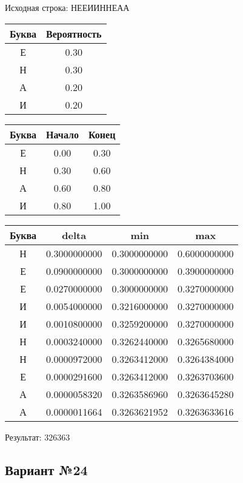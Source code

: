 \documentclass[a4paper, 12pt]{article}
\begin{document}
Исходная строка: НЕЕИИННЕАА\
\begin{center}
 \begin{tabular}{ |c|c| } 
  \hline
     Буква & Вероятность \\ \hline
Е & 0.30\\\hline
Н & 0.30\\\hline
А & 0.20\\\hline
И & 0.20
\\ \hline \end{tabular}
\end{center}
\begin{center}
 \begin{tabular}{ |c|c|c| } 
  \hline
     Буква & Начало & Конец \\ \hline
Е & 0.00 & 0.30\\\hline
Н & 0.30 & 0.60\\\hline
А & 0.60 & 0.80\\\hline
И & 0.80 & 1.00
\\ \hline \end{tabular}
\end{center}
\begin{center}
 \begin{tabular}{ |c|c|c|c| } 
  \hline
     Буква & delta & min & max \\ \hline
Н & 0.3000000000 & 0.3000000000 & 0.6000000000\\\hline
Е & 0.0900000000 & 0.3000000000 & 0.3900000000\\\hline
Е & 0.0270000000 & 0.3000000000 & 0.3270000000\\\hline
И & 0.0054000000 & 0.3216000000 & 0.3270000000\\\hline
И & 0.0010800000 & 0.3259200000 & 0.3270000000\\\hline
Н & 0.0003240000 & 0.3262440000 & 0.3265680000\\\hline
Н & 0.0000972000 & 0.3263412000 & 0.3264384000\\\hline
Е & 0.0000291600 & 0.3263412000 & 0.3263703600\\\hline
А & 0.0000058320 & 0.3263586960 & 0.3263645280\\\hline
А & 0.0000011664 & 0.3263621952 & 0.3263633616
\\ \hline \end{tabular}
\end{center}
Результат: 326363
\pagebreak
\subsection{Вариант №24}
\end{document}
